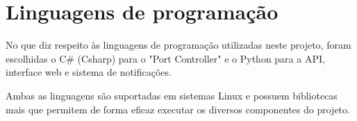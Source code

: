 \begin{comment}
Principais diferenças do Alpine Linux com a maioria das distribuições Linux disponiveis são:
\begin{itemize}
    \item O seu \textit{init system} é o OpenRC;
    \item A \textit{shell} predefenida é o busybox ao contrário do famoso \textit{Bash} ou ZSH;
    \item Gestor de pagotes é o "\texttt{apk} (\textit{Alpine Package Keeper})";
    \item Por padrão, para executar comandos de forma administrativa é ncessário usar do comados "\texttt{doas}" em vez do "\texttt{sudo}".
\end{itemize} 

\subsection{Conlusão}

Em suma, o Alpine Linux é uma excelente escolha quando o objetivo é ter um sistema 
leve, seguro e eficiente, especialmente adequado para ambientes de servidores, containers
e sistemas embutidos.


\end{comment}


\section{Linguagens de programação}




No que diz respeito às linguagens de programação utilizadas neste projeto, foram 
escolhidas o C\# (Csharp) para o "Port Controller" e o Python para a API, 
interface web e sistema de notificações.

Ambas as linguagens são suportadas em sistemas Linux e possuem bibliotecas mais 
que permitem de forma eficaz executar os diversos componentes do projeto.





